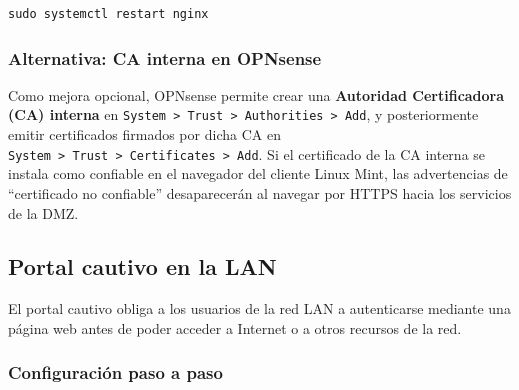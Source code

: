 \documentclass{article}
\renewcommand{\_}{\oldunderscore\hskip0pt\relax}
\begin{document}
\begin{Verbatim}[fontsize=\footnotesize,frame=single,rulecolor=\color{codebg},fillcolor=\color{codebg},framesep=2mm,xleftmargin=1mm,xrightmargin=1mm,breaklines=true,breakanywhere=true,breaksymbolleft={},breaksymbolright={}]
sudo systemctl restart nginx
\end{Verbatim}

\hypertarget{alternativa-ca-interna-en-opnsense}{%
\subsubsection{Alternativa: CA interna en
OPNsense}\label{alternativa-ca-interna-en-opnsense}}

Como mejora opcional, OPNsense permite crear una \textbf{Autoridad
Certificadora (CA) interna} en
\texttt{System\ \textgreater{}\ Trust\ \textgreater{}\ Authorities\ \textgreater{}\ Add},
y posteriormente emitir certificados firmados por dicha CA en
\texttt{System\ \textgreater{}\ Trust\ \textgreater{}\ Certificates\ \textgreater{}\ Add}.
Si el certificado de la CA interna se instala como confiable en el
navegador del cliente Linux Mint, las advertencias de ``certificado no
confiable'' desaparecerán al navegar por HTTPS hacia los servicios de la
DMZ.

\hypertarget{portal-cautivo-en-la-lan}{%
\subsection{Portal cautivo en la LAN}\label{portal-cautivo-en-la-lan}}

El portal cautivo obliga a los usuarios de la red LAN a autenticarse
mediante una página web antes de poder acceder a Internet o a otros
recursos de la red.

\hypertarget{configuraciuxf3n-paso-a-paso}{%
\subsubsection{Configuración paso a
paso}\label{configuraciuxf3n-paso-a-paso}}
\end{document}
